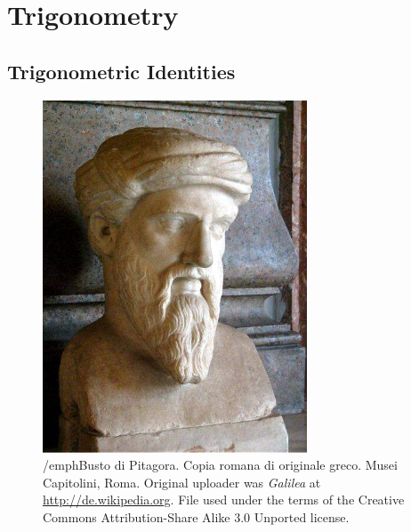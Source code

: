 \chapter{Trigonometry}


\section{Trigonometric Identities}
\begin{figure}[h]
  \begin{center}
      \includegraphics[width=0.7\textwidth]{photos/pythagoras.jpg}
    \end{center}
    \caption{/emph{Busto di Pitagora. Copia romana di originale greco. Musei Capitolini, Roma}.
    Original uploader was \emph{Galilea} at \url{http://de.wikipedia.org}.
    File used under the terms of the Creative Commons Attribution-Share Alike 3.0 Unported license.}
  \label{fig:bustofpythagoras}
\end{figure}
